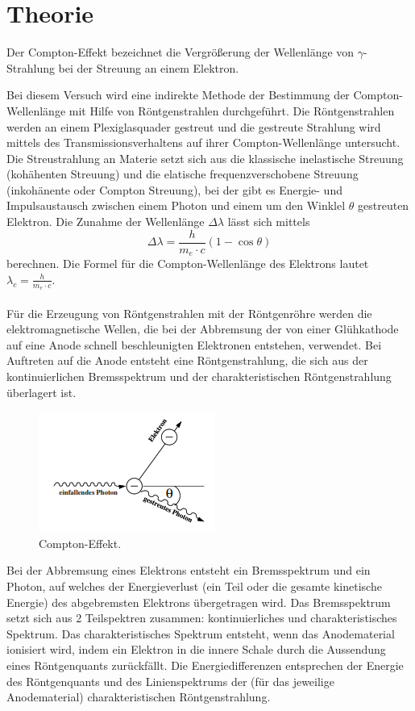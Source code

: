 \section{Theorie}
\label{sec:Theorie}
  
  Der Compton-Effekt bezeichnet die Vergrößerung der Wellenlänge von $\gamma$-Strahlung bei der Streuung an einem Elektron.
  
  Bei diesem Versuch wird eine indirekte Methode der Bestimmung der Compton-Wellenlänge mit Hilfe von Röntgenstrahlen durchgeführt. 
  Die Röntgenstrahlen werden an einem Plexiglasquader gestreut und die gestreute Strahlung wird mittels des Transmissionsverhaltens auf ihrer Compton-Wellenlänge untersucht.\\
  Die Streustrahlung an Materie setzt sich aus die klassische inelastische Streuung (kohähenten Streuung) und die elatische frequenzverschobene Streuung (inkohänente oder Compton Streuung), bei der gibt es Energie- und Impulsaustausch zwischen einem Photon und einem um den Winklel $\theta$ gestreuten Elektron.
  Die Zunahme der Wellenlänge $\Delta \lambda$ lässt sich mittels
\begin{equation}
  \Delta \lambda= \frac{h}{m_e \cdot c}(1-\cos \theta)
\end{equation} berechnen.
  Die Formel für die Compton-Wellenlänge des Elektrons lautet \(\lambda_c =\frac{h}{m_e \cdot c}\).
  \paragraph{}
   Für die Erzeugung von Röntgenstrahlen mit der Röntgenröhre werden die elektromagnetische Wellen, die bei der Abbremsung der von einer Glühkathode auf eine Anode schnell beschleunigten Elektronen entstehen, verwendet.
  Bei Auftreten auf die Anode entsteht eine Röntgenstrahlung, die sich aus der kontinuierlichen Bremsspektrum und der charakteristischen Röntgenstrahlung überlagert ist.

\begin{figure}[H]
    \centering
    \includegraphics{Compton-Effekt.png}
    \caption{Compton-Effekt.}
    \label{fig:Compton-Effekt}
  \end{figure}
   Bei der Abbremsung eines Elektrons entsteht ein Bremsspektrum und ein Photon, auf welches der Energieverlust (ein Teil oder die gesamte kinetische Energie) des abgebremsten Elektrons übergetragen wird.
Das Bremsspektrum setzt sich aus 2 Teilspektren zusammen: kontinuierliches und charakteristisches Spektrum. 
Das charakteristisches Spektrum entsteht, wenn das Anodematerial ionisiert wird, indem ein Elektron in die innere Schale durch die Aussendung eines Röntgenquants zurückfällt. 
Die Energiedifferenzen entsprechen der Energie des Röntgenquants und des Linienspektrums der (für das jeweilige Anodematerial) charakteristischen Röntgenstrahlung.

